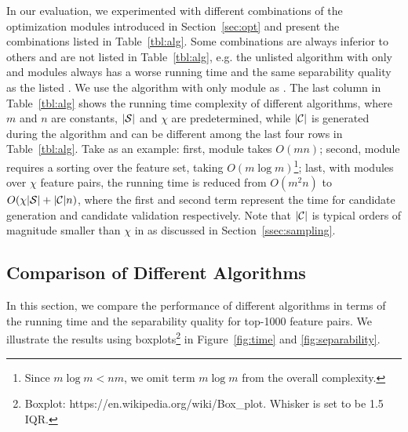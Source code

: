  In our evaluation, we experimented with different combinations of the optimization modules introduced in Section~\ref{sec:opt} and present the combinations listed in Table~\ref{tbl:alg}. Some combinations are always inferior to others and are not listed in Table~\ref{tbl:alg}, e.g. the unlisted algorithm with only \trans and \earlyT modules  always has a worse running time and the same separability quality as the listed \earlyOrder. We use the algorithm with only \trans module as \baseline. The last column in Table~\ref{tbl:alg} shows the running time complexity of different algorithms, where $m$ and $n$ are constants, $|\sss|$ and $\chi$ are predetermined, while $|\cc|$ is generated during the algorithm and can be different among the last four rows in Table~\ref{tbl:alg}. Take \horiz as an example: first, \trans module takes $O(mn)$; second, \traversal module requires a sorting over the feature set, taking $O(m\log m)$\footnote{Since $m\log m < nm$, we omit term $m\log m$ from the overall complexity.}; last, with \sampling modules over $\chi$ feature pairs, the running time is reduced from $O(m^2n)$ to $O(\chi|\sss|+|\cc|n)$, where the first and second term represent the time for candidate generation and candidate validation respectively. Note that $|\cc|$ is typical orders of magnitude smaller than $\chi$ in \horiz as discussed in Section~\ref{ssec:sampling}. 

\subsection{Comparison of Different Algorithms}
In this section, we compare the performance of different algorithms in terms of the running time and the separability quality for top-1000 feature pairs. We illustrate the results using boxplots\footnote{Boxplot: https://en.wikipedia.org/wiki/Box\_plot. Whisker is set to be 1.5 IQR.} in Figure~\ref{fig:time} and \ref{fig:separability}. 



